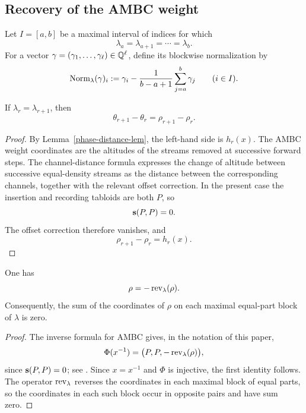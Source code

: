 \documentclass[11pt]{article}
\begin{document}
\subsection{Recovery of the AMBC weight}

Let $I=[a,b]$ be a maximal interval of indices for which
\[
\lambda_a=\lambda_{a+1}=\cdots=\lambda_b.
\]
For a vector $\gamma=(\gamma_1,\ldots,\gamma_{\ell})\in\mathbb{Q}^{\ell}$,
define its blockwise normalization by
\begin{equation}
\label{block-normalization-eq}
\operatorname{Norm}_{\lambda}(\gamma)_i
:=
\gamma_i-
\frac{1}{b-a+1}\sum_{j=a}^{b}\gamma_j
\qquad(i\in I).
\end{equation}

\begin{lemma}
\label{phase-altitude-lem}
If $\lambda_r=\lambda_{r+1}$, then
\[
\theta_{r+1}-\theta_r
=
\rho_{r+1}-\rho_r.
\]
\end{lemma}

\begin{proof}
By Lemma~\ref{phase-distance-lem}, the left-hand side is $h_r(x)$.
The AMBC weight coordinates are the altitudes of the streams removed at
successive forward steps.  The channel-distance formula
\cite[Theorem~15.3]{CPY} expresses the change of altitude between
successive equal-density streams as the distance between the corresponding
channels, together with the relevant offset correction.  In the present
case the insertion and recording tabloids are both $P$, so
\[
\mathbf{s}(P,P)=0.
\]
The offset correction therefore vanishes, and
\[
\rho_{r+1}-\rho_r=h_r(x).
\]
\end{proof}

\begin{lemma}
\label{rho-antisymmetry-lem}
One has
\[
\rho=-\operatorname{\textup{rev}}_{\lambda}(\rho).
\]
Consequently, the sum of the coordinates of $\rho$ on each maximal
equal-part block of $\lambda$ is zero.
\end{lemma}

\begin{proof}
The inverse formula for AMBC gives, in the notation of this paper,
\[
\Phi(x^{-1})
=
\bigl(P,P,-\operatorname{\textup{rev}}_{\lambda}(\rho)\bigr),
\]
since $\mathbf{s}(P,P)=0$; see \cite[Proposition~3.1]{CLP}.
Since $x=x^{-1}$ and $\Phi$ is injective, the first identity follows.
The operator $\operatorname{\textup{rev}}_{\lambda}$ reverses the coordinates in each maximal
block of equal parts, so the coordinates in each such block occur in
opposite pairs and have sum zero.
\end{proof}
\end{document}
